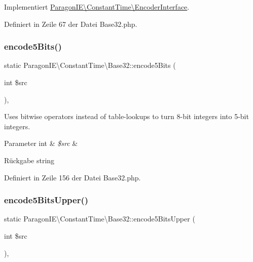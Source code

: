 Implementiert \mbox{\hyperlink{interface_paragon_i_e_1_1_constant_time_1_1_encoder_interface_a6b9b7e0f5446b6b08b074a9fc7ae3c61}{Paragon\+I\+E\textbackslash{}\+Constant\+Time\textbackslash{}\+Encoder\+Interface}}.



Definiert in Zeile 67 der Datei Base32.\+php.

\mbox{\label{class_paragon_i_e_1_1_constant_time_1_1_base32_a663f1dc13e3fb19c03b7335894931978}} 
\subsubsection{\texorpdfstring{encode5\+Bits()}{encode5Bits()}}
{\footnotesize\ttfamily static Paragon\+I\+E\textbackslash{}\+Constant\+Time\textbackslash{}\+Base32\+::encode5\+Bits (\begin{DoxyParamCaption}\item[{int}]{\$src }\end{DoxyParamCaption})\hspace{0.3cm}{\ttfamily [static]}, {\ttfamily [protected]}}

Uses bitwise operators instead of table-\/lookups to turn 8-\/bit integers into 5-\/bit integers.


\begin{DoxyParams}[1]{Parameter}
int & {\em \$src} & \\
\hline
\end{DoxyParams}
\begin{DoxyReturn}{Rückgabe}
string 
\end{DoxyReturn}


Definiert in Zeile 156 der Datei Base32.\+php.

\mbox{\label{class_paragon_i_e_1_1_constant_time_1_1_base32_aa456c4efdc8c51e5f55b58baca3f2f6d}} 
\subsubsection{\texorpdfstring{encode5\+Bits\+Upper()}{encode5BitsUpper()}}
{\footnotesize\ttfamily static Paragon\+I\+E\textbackslash{}\+Constant\+Time\textbackslash{}\+Base32\+::encode5\+Bits\+Upper (\begin{DoxyParamCaption}\item[{int}]{\$src }\end{DoxyParamCaption})\hspace{0.3cm}{\ttfamily [static]}, {\ttfamily [protected]}}

